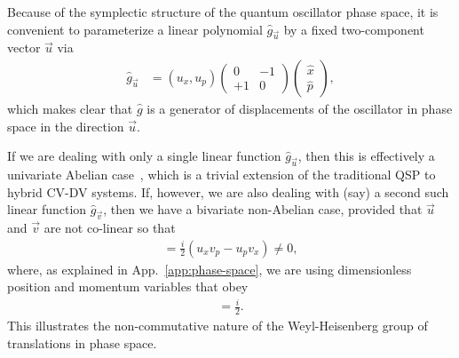 \documentclass[aps,prx,showpacs,notitlepage,twocolumn,superscriptaddress,nofootinbib,preprintnumbers,floatfix,10pt, longbibliography]{revtex4-2}
\begin{document}
Because of the symplectic structure of the quantum oscillator phase space, it is convenient to parameterize a linear polynomial $\hat g_{\vec u}$ by a fixed two-component vector $\vec u$ via
\begin{align}
    \hat g_{\vec u}&=(u_x,u_p)\left(\begin{array}{cc}
        0 &-1  \\
        +1 & 0
    \end{array}\right)\left(
    \begin{array}{c}
         \hat x  \\
         \hat p
    \end{array}\right),
\end{align}
which makes clear that $\hat g$ is a generator of displacements of the oscillator in phase space in the direction $\vec u$.

If we are dealing with only a single linear function $\hat g_{\vec u}$,
then this is effectively a univariate Abelian case~\cite{sinanan2023single,xsgf-txnq}, which is a trivial extension of the traditional QSP to hybrid CV-DV systems. If, however, we are also dealing with (say) a second such linear function $\hat g_{\vec v}$, 
then we have a bivariate non-Abelian case, provided that $\vec u$ and $\vec v$ are not co-linear so that
\begin{align}
   [\hat g_{\vec u},\hat g_{\vec v}]=\frac{i}{2}\left( u_xv_p-u_pv_x\right)\ne 0,
\end{align}
where, as explained in App.~\ref{app:phase-space}, we are using dimensionless position and momentum variables that obey
\begin{align}
    [\hat x,\hat p]=\frac{i}{2}.\label{eq:xpcommutator}
\end{align}
This illustrates the non-commutative nature of the Weyl-Heisenberg group of translations in phase space.
\end{document}
